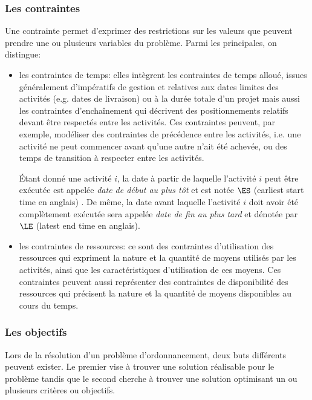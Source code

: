 \subsubsection{Les contraintes}

Une contrainte permet d'exprimer des restrictions sur les valeurs que
peuvent prendre une ou plusieurs variables du problème. Parmi les
principales, on distingue:
\begin{itemize}
\item les contraintes de temps: elles intègrent les contraintes de
  temps alloué, issues généralement d'impératifs de gestion et
  relatives aux dates limites des activités (e.g. dates
    de livraison) ou à la durée totale d'un projet mais aussi les
    contraintes d'enchaînement qui décrivent des
    positionnements relatifs devant être respectés entre les
    activités. Ces contraintes peuvent, par exemple, modéliser des
    contraintes de précédence entre les activités, i.e. une activité
    ne peut commencer avant qu'une autre n'ait été achevée, ou des temps
    de transition à respecter entre les activités.

    {\'E}tant donné une activité $i$, la date à partir
    de laquelle l'activité $i$ peut être exécutée est appelée {\it
      date de début au plus tôt} et est notée $\ES$ (earliest
    start time en anglais) . De même, la date avant
laquelle l'activité $i$ doit avoir été complètement exécutée sera
appelée {\it date de fin au plus tard} et 
dénotée par $\LE$ (latest end time en anglais).

\item les contraintes de ressources:  ce sont des contraintes d'utilisation
  des ressources qui expriment la nature et la quantité de moyens
  utilisés par les activités, ainsi que les caractéristiques
  d'utilisation de ces moyens. Ces contraintes peuvent aussi représenter
  des contraintes de disponibilité des ressources qui précisent la
  nature et la quantité de moyens disponibles au cours du temps.
\end{itemize}

\subsubsection{Les objectifs}

Lors de la résolution d'un problème d'ordonnancement, deux buts
différents peuvent exister. Le premier vise à trouver une solution
réalisable pour le problème tandis que le second cherche à trouver une
solution optimisant un ou plusieurs critères ou objectifs.

